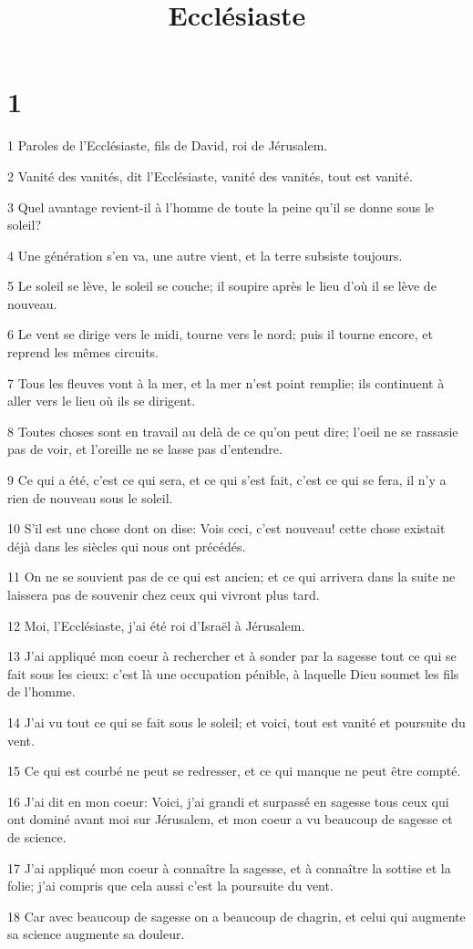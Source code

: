 

\title{Ecclésiaste}


\chapter{1}

\par 1 Paroles de l'Ecclésiaste, fils de David, roi de Jérusalem.
\par 2 Vanité des vanités, dit l'Ecclésiaste, vanité des vanités, tout est vanité.
\par 3 Quel avantage revient-il à l'homme de toute la peine qu'il se donne sous le soleil?
\par 4 Une génération s'en va, une autre vient, et la terre subsiste toujours.
\par 5 Le soleil se lève, le soleil se couche; il soupire après le lieu d'où il se lève de nouveau.
\par 6 Le vent se dirige vers le midi, tourne vers le nord; puis il tourne encore, et reprend les mêmes circuits.
\par 7 Tous les fleuves vont à la mer, et la mer n'est point remplie; ils continuent à aller vers le lieu où ils se dirigent.
\par 8 Toutes choses sont en travail au delà de ce qu'on peut dire; l'oeil ne se rassasie pas de voir, et l'oreille ne se lasse pas d'entendre.
\par 9 Ce qui a été, c'est ce qui sera, et ce qui s'est fait, c'est ce qui se fera, il n'y a rien de nouveau sous le soleil.
\par 10 S'il est une chose dont on dise: Vois ceci, c'est nouveau! cette chose existait déjà dans les siècles qui nous ont précédés.
\par 11 On ne se souvient pas de ce qui est ancien; et ce qui arrivera dans la suite ne laissera pas de souvenir chez ceux qui vivront plus tard.
\par 12 Moi, l'Ecclésiaste, j'ai été roi d'Israël à Jérusalem.
\par 13 J'ai appliqué mon coeur à rechercher et à sonder par la sagesse tout ce qui se fait sous les cieux: c'est là une occupation pénible, à laquelle Dieu soumet les fils de l'homme.
\par 14 J'ai vu tout ce qui se fait sous le soleil; et voici, tout est vanité et poursuite du vent.
\par 15 Ce qui est courbé ne peut se redresser, et ce qui manque ne peut être compté.
\par 16 J'ai dit en mon coeur: Voici, j'ai grandi et surpassé en sagesse tous ceux qui ont dominé avant moi sur Jérusalem, et mon coeur a vu beaucoup de sagesse et de science.
\par 17 J'ai appliqué mon coeur à connaître la sagesse, et à connaître la sottise et la folie; j'ai compris que cela aussi c'est la poursuite du vent.
\par 18 Car avec beaucoup de sagesse on a beaucoup de chagrin, et celui qui augmente sa science augmente sa douleur.

